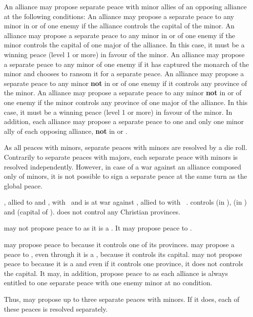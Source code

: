  An alliance may propose separate
peace with minor allies of an opposing alliance at the following conditions:
\bparag An alliance may propose a separate peace to any minor in \VASSAL or
\ANNEXION of one enemy if the alliance controls the capital of the minor.
\bparag An alliance may propose a separate peace to any minor in \VASSAL or
\ANNEXION of one enemy if the minor controls the capital of one major of the
alliance. In this case, it must be a winning peace (level 1 or more) in favour
of the minor.
\bparag An alliance may propose a separate peace to any minor of one enemy if
it has captured the monarch of the minor and chooses to ransom it for a
separate peace.
\bparag An alliance may propose a separate peace to any minor \textbf{not} in
\VASSAL or \ANNEXION of one enemy if it controls any province of the minor.
\bparag An alliance may propose a separate peace to any minor \textbf{not} in
\VASSAL or \ANNEXION of one enemy if the minor controls any province of one
major of the alliance. In this case, it must be a winning peace (level 1 or
more) in favour of the minor.
\bparag In addition, each alliance may propose a separate peace to one and
only one minor ally of each opposing alliance, \textbf{not} in \VASSAL or
\ANNEXION.

\bparag As all peaces with minors, separate peaces with minors are resolved by
a die roll.
\bparag Contrarily to separate peaces with majors, each separate peace with
minors is resolved independently.
\bparag However, in case of a war against an alliance composed only of minors,
it is not possible to sign a separate peace at the same turn as the global
peace.

\begin{exemple}
  \TUR, allied to \paysMaroc and \paysTripoli, with \VASSAL\ \paysAlgerie and
  \paysTunisie is at war against \HIS, allied to \paysVenise with \VASSAL\
  \paysChevaliers. \HIS controls \provinceJebelTubqal (in \paysMaroc),
  \provinceOran (in \paysAlgerie) and \provinceIfriqiya (capital of
  \paysTunisie). \TUR does not control any Christian provinces.

  \TUR may not propose peace to \paysChevaliers as it is a \VASSAL. It may
  propose peace to \paysVenise.

  \HIS may propose peace to \paysMaroc because it controls one of its
  provinces. \HIS may propose a peace to \paysTunisie, even through it is a
  \VASSAL, because it controls its capital. \HIS may not propose peace to
  \paysAlgerie because it is a \VASSAL and even if it controls one province,
  it does not controls the capital. It may, in addition, propose peace to
  \paysTripoli as each alliance is always entitled to one separate peace with
  one enemy minor at no condition. 

  Thus, \HIS may propose up to three separate peaces with minors. If it does,
  each of these peaces is resolved separately.
\end{exemple}

